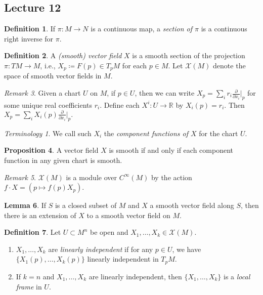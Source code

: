 \documentclass[10pt,letterpaper,cm]{nupset}
\theoremstyle{definition}
\newtheorem{definition}{Definition}[subsection]
\theoremstyle{theorem}
\newtheorem{lemma}[definition]{Lemma}
\newtheorem{prop}[definition]{Proposition}
\theoremstyle{remark}
\newtheorem{remark}[definition]{Remark}
\newtheorem*{term}{Terminology}
\newcommand{\R}{\mathbb R}
\newcommand{\1}{\mathbf{1}}
\newcommand{\0}{\vec 0}
\begin{document}
\subsection{Lecture 12}

\begin{definition}
If $\pi : M \to N$ is a continuous map, a \textit{section of $\pi$} is a continuous right inverse for $\pi$.
\end{definition}

\begin{definition}
A \textit{(smooth) vector field} $X$ is a smooth section of the projection $\pi : TM \to M$, i.e., $X_p\coloneqq  F(p) \in T_pM$ for each $p \in M$. 
Let $\mathscr{X}(M)$ denote the space of smooth vector fields in $M$.
\end{definition}

\begin{remark}
Given a chart $U$ on $M$, if $p\in U$, then we can write $X_p = \sum_i r_i \frac{\partial}{\partial x_i}\bigr\rvert_p$ for some unique real coefficients $r_i$. Define each $X^i : U \to \R$ by $X_i(p) = r_i$. Then $X_p = \sum_i X_i(p) \frac{\partial}{\partial x_i}\bigr\rvert_p.$
\end{remark}

\begin{term}
We call such $X_i$ the \textit{component functions of $X$} for the chart $U$.
\end{term}

\begin{prop}
A vector field $X$ is smooth if and only if each component function in any given chart is smooth.
\end{prop}

\begin{remark}
$\mathscr{X}(M)$ is a module over $C^{\infty}(M)$ by the action $f \cdot X = (p \mapsto f(p)X_p)$.
\end{remark}

\begin{lemma}
If $S$ is a closed subset of $M$ and $X$ a smooth vector field along $S$, then there is an extension of $X$ to a smooth vector field on $M$.
\end{lemma}

\begin{definition} Let $U \subset M^n$ be open and $X_1, \ldots, X_k \in \mathscr{X}(M)$. 
\begin{enumerate}
\item  $X_1, \ldots, X_k$ are \textit{linearly independent} if for any $p\in U$, we have $\{X_1(p), \ldots, X_k(p)\}$ linearly independent in $T_pM$.
\item If $k=n$ and $X_1, \ldots, X_k$ are linearly independent, then $\{X_1, \ldots, X_k\}$ is a \textit{local frame} in $U$.
\end{enumerate}
\end{definition}
\end{document}
